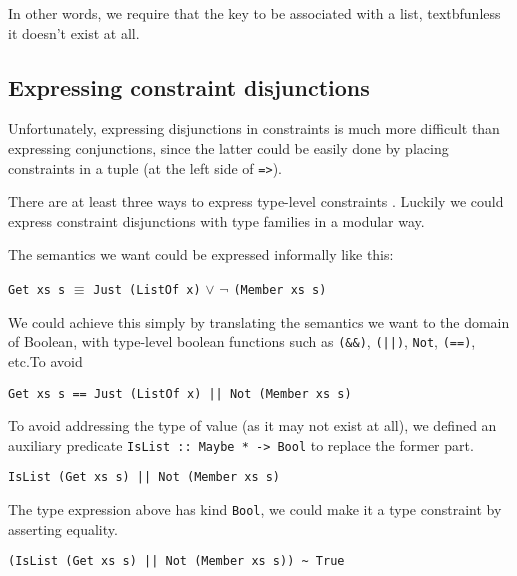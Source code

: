 \documentclass[pldi]{sigplanconf-pldi16}
\begin{document}
In other words, we require that the key to be associated with a list,
 textbf{unless} it doesn't exist at all.

\subsection{Expressing constraint disjunctions}

Unfortunately, expressing disjunctions in constraints is much more difficult
 than expressing conjunctions, since the latter could be easily done by placing
 constraints in a tuple (at the left side of \texttt{=>}).

There are at least three ways to express type-level constraints
\cite{singletons}. Luckily we could express constraint disjunctions with type
 families in a modular way.

The semantics we want could be expressed informally like this:

\texttt{Get xs s} $\equiv$ \texttt{Just (ListOf x)}
$\vee$ $\neg$ \texttt{(Member xs s)}

We could achieve this simply by translating the semantics we want to the
 domain of Boolean, with type-level boolean functions such as
\texttt{(&&)},
\texttt{(||)}, \texttt{Not},
\texttt{(==)}, etc.\footnotemark To avoid


\begin{verbatim}
Get xs s == Just (ListOf x) || Not (Member xs s)
\end{verbatim}

To avoid addressing the type of value (as it may not exist at all), we defined
 an auxiliary predicate \texttt{IsList :: Maybe * -> Bool} to
 replace the former part.

\begin{verbatim}
IsList (Get xs s) || Not (Member xs s)
\end{verbatim}

The type expression above has kind \texttt{Bool}, we could make it
 a type constraint by asserting equality.

\begin{verbatim}
(IsList (Get xs s) || Not (Member xs s)) ~ True
\end{verbatim}
\end{document}

